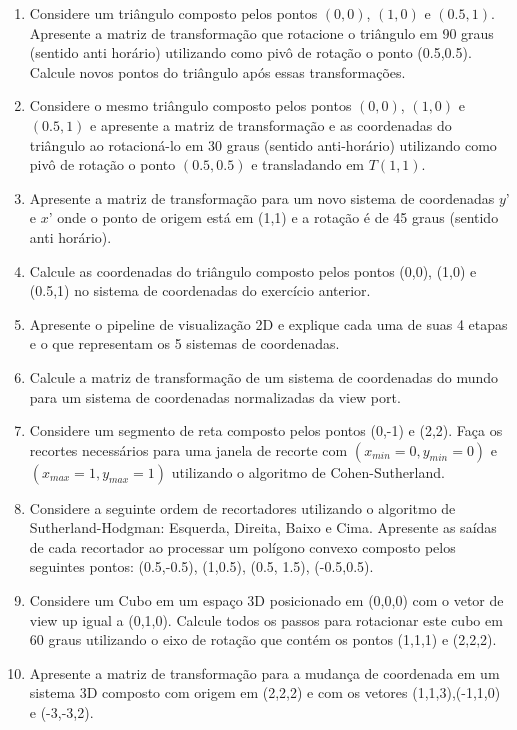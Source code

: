 \documentclass[12pt,a4paper]{article}
\begin{document}
\begin{enumerate}
	\item Considere um triângulo composto pelos pontos $(0,0)$, $(1,0)$ e $(0.5,1)$. Apresente a matriz de transformação que rotacione o triângulo em 90 graus (sentido anti horário) utilizando como pivô de rotação o ponto (0.5,0.5). Calcule novos pontos do triângulo após essas transformações.

	\item Considere o mesmo triângulo composto pelos pontos $(0,0)$, $(1,0)$ e $(0.5,1)$
e apresente a matriz de transformação e as coordenadas do triângulo ao rotacioná-lo em 30 graus (sentido anti-horário) utilizando como pivô de rotação o ponto $(0.5, 0.5)$ e transladando em $T(1,1)$.	

	\item Apresente a matriz de transformação para um novo sistema de coordenadas $y’$ e $x’$ onde o ponto de origem está em (1,1) e a rotação  é de 45 graus (sentido anti horário).
	
	\item Calcule as coordenadas do triângulo composto pelos pontos (0,0), (1,0) e
(0.5,1) no sistema de coordenadas do exercício anterior.

	\item Apresente o pipeline de visualização 2D e explique cada uma de suas 4
etapas e o que representam os 5 sistemas de coordenadas.

	\item Calcule a matriz de transformação de um sistema de coordenadas do
mundo para um sistema de coordenadas normalizadas da view port.

	\item Considere um segmento de reta composto pelos pontos (0,-1) e (2,2). Faça
os recortes necessários para uma janela de recorte com $(x_{min} = 0, y_{min} =0)$ e $(x_{max} = 1, y_{max} = 1)$ utilizando o algoritmo de Cohen-Sutherland.

	\item Considere a seguinte ordem de recortadores utilizando o algoritmo de Sutherland-Hodgman: Esquerda, Direita, Baixo e Cima. Apresente as saídas de cada recortador ao processar um polígono convexo composto pelos seguintes pontos: (0.5,-0.5), (1,0.5), (0.5, 1.5), (-0.5,0.5).
	
	\item Considere um Cubo em um espaço 3D posicionado em (0,0,0) com o vetor de view up igual a (0,1,0). Calcule todos os passos para rotacionar este cubo em 60 graus utilizando o eixo de rotação que contém os pontos (1,1,1) e (2,2,2).
	
	\item Apresente a matriz de transformação para a mudança de coordenada em um sistema 3D composto com origem em (2,2,2) e com os vetores (1,1,3),(-1,1,0) e (-3,-3,2).

\end{enumerate}
\end{document}
